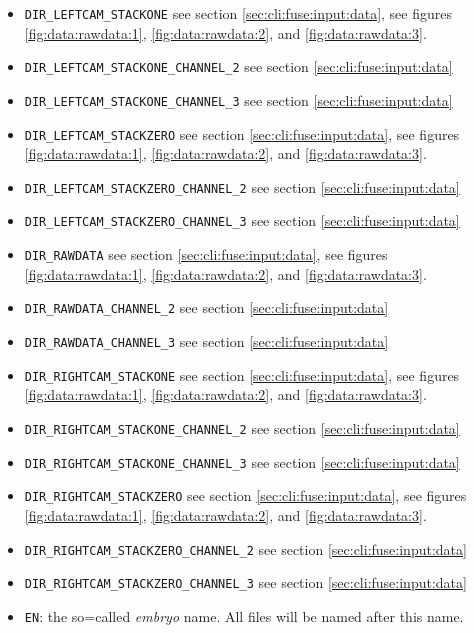 \begin{itemize}
\itemsep -0.5ex
\item \texttt{DIR\_LEFTCAM\_STACKONE} 
see section \ref{sec:cli:fuse:input:data}, 
see figures \ref{fig:data:rawdata:1}, 
\ref{fig:data:rawdata:2}, 
and \ref{fig:data:rawdata:3}.
\item \texttt{DIR\_LEFTCAM\_STACKONE\_CHANNEL\_2} 
see section \ref{sec:cli:fuse:input:data}
\item \texttt{DIR\_LEFTCAM\_STACKONE\_CHANNEL\_3} 
see section \ref{sec:cli:fuse:input:data}
\item \texttt{DIR\_LEFTCAM\_STACKZERO} 
see section \ref{sec:cli:fuse:input:data},
see figures \ref{fig:data:rawdata:1}, 
\ref{fig:data:rawdata:2}, 
and \ref{fig:data:rawdata:3}.
\item \texttt{DIR\_LEFTCAM\_STACKZERO\_CHANNEL\_2} 
see section \ref{sec:cli:fuse:input:data}
\item \texttt{DIR\_LEFTCAM\_STACKZERO\_CHANNEL\_3} 
see section \ref{sec:cli:fuse:input:data}
\item \texttt{DIR\_RAWDATA} 
see section \ref{sec:cli:fuse:input:data},
see figures \ref{fig:data:rawdata:1}, 
\ref{fig:data:rawdata:2}, 
and \ref{fig:data:rawdata:3}.
\item \texttt{DIR\_RAWDATA\_CHANNEL\_2} 
see section \ref{sec:cli:fuse:input:data}
\item \texttt{DIR\_RAWDATA\_CHANNEL\_3} 
see section \ref{sec:cli:fuse:input:data}
\item \texttt{DIR\_RIGHTCAM\_STACKONE} 
see section \ref{sec:cli:fuse:input:data},
see figures \ref{fig:data:rawdata:1}, 
\ref{fig:data:rawdata:2}, 
and \ref{fig:data:rawdata:3}.
\item \texttt{DIR\_RIGHTCAM\_STACKONE\_CHANNEL\_2} 
see section \ref{sec:cli:fuse:input:data}
\item \texttt{DIR\_RIGHTCAM\_STACKONE\_CHANNEL\_3} 
see section \ref{sec:cli:fuse:input:data}
\item \texttt{DIR\_RIGHTCAM\_STACKZERO} 
see section \ref{sec:cli:fuse:input:data},
see figures \ref{fig:data:rawdata:1}, 
\ref{fig:data:rawdata:2}, 
and \ref{fig:data:rawdata:3}.
\item \texttt{DIR\_RIGHTCAM\_STACKZERO\_CHANNEL\_2} 
see section \ref{sec:cli:fuse:input:data}
\item \texttt{DIR\_RIGHTCAM\_STACKZERO\_CHANNEL\_3} 
see section \ref{sec:cli:fuse:input:data}
\item \texttt{EN}: 
  the so=called \textit{embryo} name. 
  All files will be named after this name.

\end{itemize}
